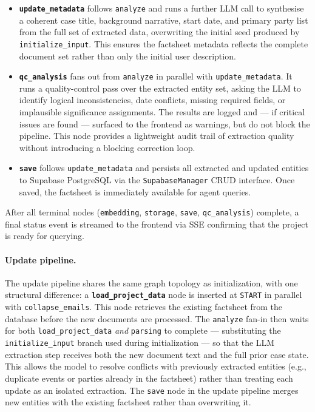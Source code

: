 \begin{itemize}
    \item \textbf{\texttt{update\_metadata}} follows \texttt{analyze} and runs a further LLM call to synthesise a coherent case title, background narrative, start date, and primary party list from the full set of extracted data, overwriting the initial seed produced by \texttt{initialize\_input}. This ensures the factsheet metadata reflects the complete document set rather than only the initial user description.

    \item \textbf{\texttt{qc\_analysis}} fans out from \texttt{analyze} in parallel with \texttt{update\_metadata}. It runs a quality-control pass over the extracted entity set, asking the LLM to identify logical inconsistencies, date conflicts, missing required fields, or implausible significance assignments. The results are logged and — if critical issues are found — surfaced to the frontend as warnings, but do not block the pipeline. This node provides a lightweight audit trail of extraction quality without introducing a blocking correction loop.

    \item \textbf{\texttt{save}} follows \texttt{update\_metadata} and persists all extracted and updated entities to Supabase PostgreSQL via the \texttt{SupabaseManager} CRUD interface. Once saved, the factsheet is immediately available for agent queries.
\end{itemize}

After all terminal nodes (\texttt{embedding}, \texttt{storage}, \texttt{save}, \texttt{qc\_analysis}) complete, a final status event is streamed to the frontend via SSE confirming that the project is ready for querying.

\paragraph{Update pipeline.}
The update pipeline shares the same graph topology as initialization, with one structural difference: a \textbf{\texttt{load\_project\_data}} node is inserted at \texttt{START} in parallel with \texttt{collapse\_emails}. This node retrieves the existing factsheet from the database before the new documents are processed. The \texttt{analyze} fan-in then waits for both \texttt{load\_project\_data} \emph{and} \texttt{parsing} to complete --- substituting the \texttt{initialize\_input} branch used during initialization --- so that the LLM extraction step receives both the new document text and the full prior case state. This allows the model to resolve conflicts with previously extracted entities (e.g., duplicate events or parties already in the factsheet) rather than treating each update as an isolated extraction. The \texttt{save} node in the update pipeline merges new entities with the existing factsheet rather than overwriting it.

